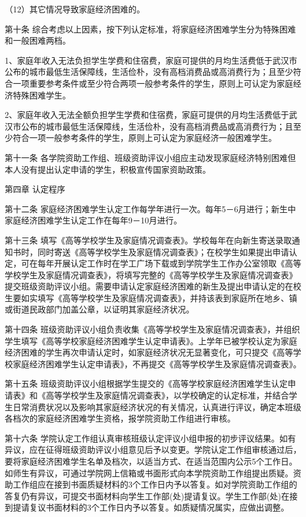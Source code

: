 \documentclass[UTF8,12pt,a4paper]{report}
\begin{document}
（12）其它情况导致家庭经济困难的。

第十条 综合考虑以上因素，按下列认定标准，将家庭经济困难学生分为特殊困难和一般困难两档。

1、家庭年收入无法负担学生学费和住宿费，家庭可提供的月均生活费低于武汉市公布的城市最低生活保障线，生活俭朴，没有高档消费品或高消费行为；且至少符合一项重要参考条件或至少符合两项一般参考条件的学生，原则上可认定为家庭经济特殊困难学生。

2、家庭年收入无法全额负担学生学费和住宿费，家庭可提供的月均生活费低于武汉市公布的城市最低生活保障线，生活俭朴，没有高档消费品或高消费行为；且至少符合一项一般参考条件的学生，原则上可认定为家庭经济一般困难学生。

第十一条 各学院资助工作组、班级资助评议小组应主动发现家庭经济特别困难但本人没有提出认定申请的学生，积极宣传国家资助政策。

第四章 认定程序

第十二条 家庭经济困难学生认定工作每学年进行一次。每年5－6月进行；新生中家庭经济困难学生认定工作在每年9－10月进行。

第十三条 填写《高等学校学生及家庭情况调查表》。学校每年在向新生寄送录取通知书时，同时寄送《高等学校学生及家庭情况调查表》；在校学生如果提出申请认定，可在每年开展认定工作时在学工广场下载或到学院学生工作办公室领取《高等学校学生及家庭情况调查表》，将填写完整的《高等学校学生及家庭情况调查表》提交班级资助评议小组。需要申请认定家庭经济困难的新生及提出申请认定的在校生要如实填写《高等学校学生及家庭情况调查表》，并持该表到家庭所在地乡、镇或街道民政部门加盖公章，以证明其家庭经济状况。

第十四条 班级资助评议小组负责收集《高等学校学生及家庭情况调查表》，并组织学生填写《高等学校家庭经济困难学生认定申请表》。上学年已被学校认定为家庭经济困难的学生再次申请认定时，如家庭经济状况无显著变化，可只提交《高等学校家庭经济困难学生认定申请表》，不再提交《高等学校学生及家庭情况调查表》。

第十五条 班级资助评议小组根据学生提交的《高等学校家庭经济困难学生认定申请表》和《高等学校学生及家庭情况调查表》，以学校确定的认定标准，并结合学生日常消费状况以及影响其家庭经济状况的有关情况，认真进行评议，确定本班级各档次的家庭经济困难学生资格，报学院资助工作组进行审核。

第十六条 学院认定工作组认真审核班级认定评议小组申报的初步评议结果。如有异议，应在征得班级资助评议小组意见后予以变更。学院认定工作组审核通过后，要将家庭经济困难学生名单及档次，以适当方式、在适当范围内公示5个工作日。如师生有异议，可通过学院网上信箱或书面形式向本学院资助工作组提出质疑。资助工作组应在接到书面质疑材料的3个工作日内予以答复。如对学院资助工作组的答复仍有异议，可提交书面材料向学生工作部(处)提请复议。学生工作部(处)在接到提请复议书面材料的3个工作日内予以答复。如质疑情况属实，应做出调整。
\end{document}
